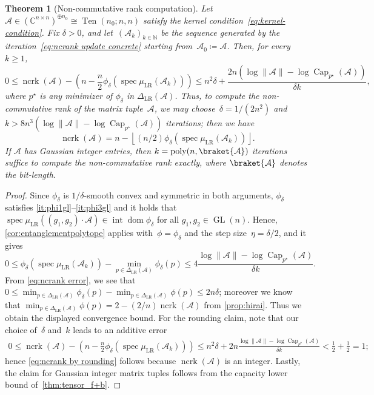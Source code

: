 \documentclass[11pt,letterpaper]{article}
\newtheorem{theorem}{Theorem}[section]
\numberwithin{equation}{section}
\newcommand{\op}{\oplus}
\newcommand{\CC}{\mathbb{C}}
\newcommand{\NN}{\mathbb{N}}
\DeclareMathOperator{\poly}{poly}
\DeclareMathOperator{\intr}{int}
\DeclareMathOperator{\dom}{dom}
\DeclareMathOperator{\spec}{spec}
\DeclareMathOperator{\Capacity}{Cap}
\DeclareMathOperator{\GL}{GL}
\DeclareMathOperator{\ncrk}{ncrk}
\DeclareMathOperator{\Ten}{Ten}
\begin{document}
\begin{theorem}[Non-commutative rank computation]\label{thm:ncrk}
    Let $\mathcal{A} \in (\CC^{n\times n})^{\op n_0} \cong \Ten(n_0; n, n)$ satisfy the kernel condition~\eqref{eq:kernel-condition}.
    Fix $\delta>0$, and let~$(\mathcal A_k)_{k\in\NN}$ be the sequence generated by the iteration~\eqref{eq:ncrank update concrete} starting from~$\mathcal A_0 \coloneqq \mathcal A$.
    Then, for every $k\geq1$,
    \[
        0 \leq \ncrk(\mathcal{A}) - \left( n - \frac n2 \phi_\delta(\spec\mu_{\mathrm{LR}}(\mathcal{A}_k)) \right)  \leq n^2\delta + \frac{2n\left(\log\|\mathcal{A}\| - \log\Capacity_{p^\star}(\mathcal{A})\right)}{\delta k},
    \]
    where $p^\star$ is any minimizer of $\phi_\delta$ in $\Delta_{\mathrm{LR}}(\mathcal{A})$.
    Thus, to compute the non-commutative rank of the matrix tuple~$\mathcal A$, we may choose~$\delta=1/(2n^2)$ and $k > 8n^3(\log\|\mathcal{A}\| - \log\Capacity_{p^\star}(\mathcal{A}))$ iterations; then we have
    \begin{equation}\label{eq:ncrank by rounding}
        \ncrk(\mathcal{A}) = n - \left\lfloor (n/2)\phi_\delta(\spec\mu_{\mathrm{LR}}(\mathcal{A}_k))\right\rfloor.
    \end{equation}
    If $\mathcal{A}$ has Gaussian integer entries, then $k = \poly(n, \braket{\mathcal A})$ iterations suffice to compute the non-commutative rank exactly, where $\braket{\mathcal A}$ denotes the bit-length.
\end{theorem}
\begin{proof}
    Since $\phi_\delta$ is $1/\delta$-smooth convex and symmetric in both arguments, $\phi_\delta$ satisfies \ref{it:phi1gl}--\ref{it:phi3gl} and it holds that $\spec \mu_{\mathrm{LR}}((g_1, g_2)\cdot \mathcal A) \in \intr\dom\phi_\delta$ for all $g_1, g_2 \in \GL(n)$.
    Hence, \cref{cor:entanglementpolytope} applies with~$\phi = \phi_\delta$ and the step size~$\eta = \delta/2$, and it gives
    \[
        0 \leq \phi_\delta(\spec\mu_{\mathrm{LR}}(\mathcal{A}_k)) - \min_{p \in \Delta_{\mathrm{LR}}(\mathcal{A})}\phi_\delta(p) \leq 4 \frac{\log\|\mathcal{A}\| - \log\Capacity_{p^\star}(\mathcal{A})}{\delta k}.
    \]
    From \cref{eq:ncrank error}, we see that $0 \le \min_{p \in \Delta_{\mathrm{LR}}(\mathcal A)}\phi_\delta(p) - \min_{p \in \Delta_{\mathrm{LR}}(\mathcal A)}\phi(p) \le 2n\delta$;
    moreover we know that $\min_{p \in \Delta_{\mathrm{LR}}(\mathcal A)}\phi(p) = 2 - (2/n)\ncrk(\mathcal{A})$ from \cref{prop:hirai}.
    Thus we obtain the displayed convergence bound.
    For the rounding claim, note that our choice of~$\delta$ and~$k$ leads to an additive error
    \begin{align*}
        0 \leq \ncrk(\mathcal{A}) - \left(n - \frac n2\phi_\delta(\spec\mu_{\mathrm{LR}}(\mathcal{A}_k))\right) \leq n^2\delta + 2n \frac{\log\|\mathcal{A}\| - \log\Capacity_{p^\star}(\mathcal{A})}{\delta k} < \frac12 + \frac12 = 1;
    \end{align*}
    hence \cref{eq:ncrank by rounding} follows because $\ncrk(\mathcal{A})$ is an integer.
    Lastly, the claim for Gaussian integer matrix tuples follows from the capacity lower bound of~\cref{thm:tensor_f+b}.
\end{proof}
\end{document}
